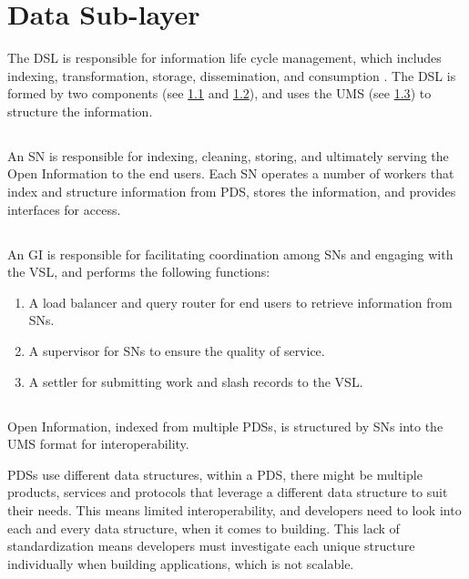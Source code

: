 \section{Data Sub-layer}
\label{sec:DSL}

The \gls{DSL} is responsible for information life cycle management, which includes indexing, transformation, storage, dissemination, and consumption \cite{nationalinstituteofstandardsandtechnology2016Information}. The \gls{DSL} is formed by two components (see \cref{subsec:SN} and \cref{subsec:GI}), and uses the \gls{UMS} (see \cref{subsec:UMS}) to structure the information.

\subsection{}
\label{subsec:SN}

An \gls{SN} is responsible for indexing, cleaning, storing, and ultimately serving the Open Information to the end users. Each \gls{SN} operates a number of workers that index and structure information from \gls{PDS}, stores the information, and provides interfaces for access.

\subsection{}
\label{subsec:GI}

An \gls{GI} is responsible for facilitating coordination among \glspl{SN} and engaging with the \gls{VSL}, and performs the following functions:
\begin{enumerate}
    \item A load balancer and query router for end users to retrieve information from \glspl{SN}.
    \item A supervisor for \glspl{SN} to ensure the quality of service.
    \item A settler for submitting work and slash records to the \gls{VSL}.
\end{enumerate}


\subsection{}
\label{subsec:UMS}

Open Information, indexed from multiple \glspl{PDS}, is structured by \glspl{SN} into the \gls{UMS} format for interoperability.

\glspl{PDS} use different data structures, within a \gls{PDS}, there might be multiple products, services and protocols that leverage a different data structure to suit their needs. This means limited interoperability, and developers need to look into each and every data structure, when it comes to building. This lack of standardization means developers must investigate each unique structure individually when building applications, which is not scalable.

